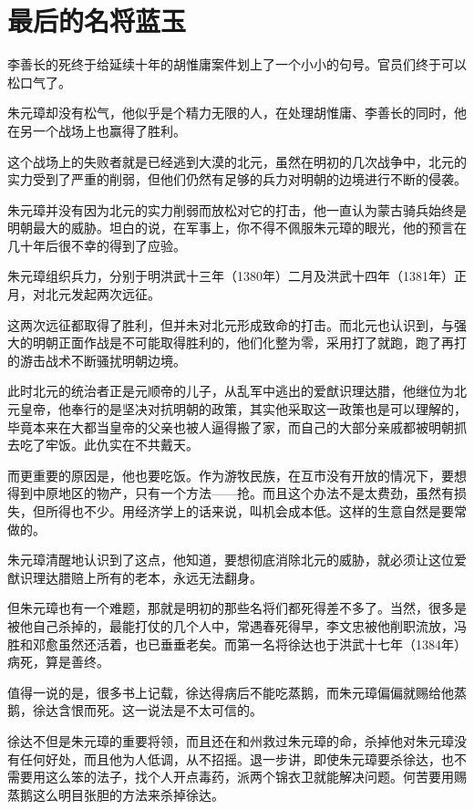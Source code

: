 \section{最后的名将蓝玉}
\ifnum{}
	\begin{multicols}{\theparacolNo}
		\fi
		李善长的死终于给延续十年的胡惟庸案件划上了一个小小的句号。官员们终于可以松口气了。

		朱元璋却没有松气，他似乎是个精力无限的人，在处理胡惟庸、李善长的同时，他在另一个战场上也赢得了胜利。

		这个战场上的失败者就是已经逃到大漠的北元，虽然在明初的几次战争中，北元的实力受到了严重的削弱，但他们仍然有足够的兵力对明朝的边境进行不断的侵袭。

		朱元璋并没有因为北元的实力削弱而放松对它的打击，他一直认为蒙古骑兵始终是明朝最大的威胁。坦白的说，在军事上，你不得不佩服朱元璋的眼光，他的预言在几十年后很不幸的得到了应验。

		朱元璋组织兵力，分别于明洪武十三年（1380年）二月及洪武十四年（1381年）正月，对北元发起两次远征。

		这两次远征都取得了胜利，但并未对北元形成致命的打击。而北元也认识到，与强大的明朝正面作战是不可能取得胜利的，他们化整为零，采用打了就跑，跑了再打的游击战术不断骚扰明朝边境。

		此时北元的统治者正是元顺帝的儿子，从乱军中逃出的爱猷识理达腊，他继位为北元皇帝，他奉行的是坚决对抗明朝的政策，其实他采取这一政策也是可以理解的，毕竟本来在大都当皇帝的父亲也被人逼得搬了家，而自己的大部分亲戚都被明朝抓去吃了牢饭。此仇实在不共戴天。

		而更重要的原因是，他也要吃饭。作为游牧民族，在互市没有开放的情况下，要想得到中原地区的物产，只有一个方法——抢。而且这个办法不是太费劲，虽然有损失，但所得也不少。用经济学上的话来说，叫机会成本低。这样的生意自然是要常做的。

		朱元璋清醒地认识到了这点，他知道，要想彻底消除北元的威胁，就必须让这位爱猷识理达腊赔上所有的老本，永远无法翻身。

		但朱元璋也有一个难题，那就是明初的那些名将们都死得差不多了。当然，很多是被他自己杀掉的，最能打仗的几个人中，常遇春死得早，李文忠被他削职流放，冯胜和邓愈虽然还活着，也已垂垂老矣。而第一名将徐达也于洪武十七年（1384年）病死，算是善终。

		值得一说的是，很多书上记载，徐达得病后不能吃蒸鹅，而朱元璋偏偏就赐给他蒸鹅，徐达含恨而死。这一说法是不太可信的。

		徐达不但是朱元璋的重要将领，而且还在和州救过朱元璋的命，杀掉他对朱元璋没有任何好处，而且他为人低调，从不招摇。退一步讲，即使朱元璋要杀徐达，也不需要用这么笨的法子，找个人开点毒药，派两个锦衣卫就能解决问题。何苦要用赐蒸鹅这么明目张胆的方法来杀掉徐达。


\end{multicols}
